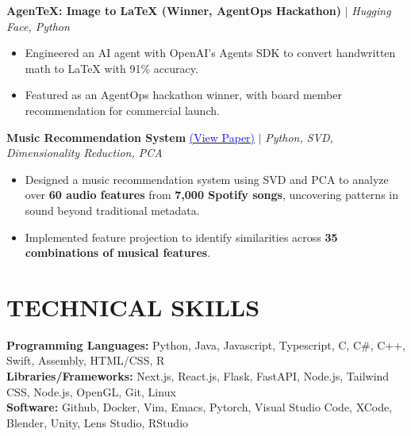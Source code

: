 \documentclass[10pt, letterpaper]{article}
\begin{document}
\smallskip

\textbf{AgenTeX: Image to LaTeX (Winner, AgentOps Hackathon)} $|$ \textit{Hugging Face, Python}
\begin{itemize}[leftmargin=1.5em, topsep=2pt, itemsep=1pt, parsep=0pt]
  \item Engineered an AI agent with OpenAI's Agents SDK to convert handwritten math to LaTeX with 91\% accuracy.
  \item Featured as an AgentOps hackathon winner, with board member recommendation for commercial launch.
\end{itemize}

\smallskip

\textbf{Music Recommendation System}
\href{https://feolukolawole.com/Music_Recommendation_Engine.pdf}{{\textcolor{blue}{(View Paper)}}}
$|$ \textit{Python, SVD, Dimensionality Reduction, PCA}
\begin{itemize}[leftmargin=1.5em, topsep=2pt, itemsep=1pt, parsep=0pt]
  \item Designed a music recommendation system using SVD and PCA to analyze over \textbf{60 audio features} from \textbf{7,000
  Spotify songs}, uncovering patterns in sound beyond traditional metadata.
  \item Implemented feature projection to identify similarities across \textbf{35 combinations of musical features}.
\end{itemize}

\section{TECHNICAL SKILLS}

\textbf{Programming Languages:} Python, Java, Javascript, Typescript, C, C\#,  C++, Swift, Assembly, HTML/CSS, R\\
\textbf{Libraries/Frameworks:} Next.js, React.js, Flask, FastAPI, Node.js, Tailwind CSS, Node.js, OpenGL, Git, Linux\\
\textbf{Software:} Github, Docker, Vim, Emacs, Pytorch, Visual Studio Code, XCode, Blender, Unity, Lens Studio, RStudio
\end{document}
